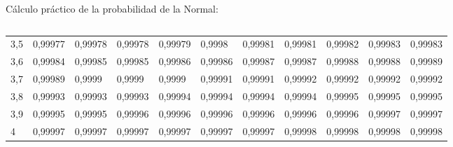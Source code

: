 \documentclass[11pt,handout]{beamer}
\begin{document}
\begin{frame}{Cálculo práctico de la probabilidad de la Normal:}
\begin{columns}
\begin{column}{0.6\textwidth}
{\begin{tabular}{l|llllllllll}
3,5 & 0,99977 & 0,99978 & 0,99978 & 0,99979 & 0,9998  & 0,99981 & 0,99981 & 0,99982 & 0,99983 & 0,99983 \\
3,6 & 0,99984 & 0,99985 & 0,99985 & 0,99986 & 0,99986 & 0,99987 & 0,99987 & 0,99988 & 0,99988 & 0,99989 \\
3,7 & 0,99989 & 0,9999  & 0,9999  & 0,9999  & 0,99991 & 0,99991 & 0,99992 & 0,99992 & 0,99992 & 0,99992 \\
3,8 & 0,99993 & 0,99993 & 0,99993 & 0,99994 & 0,99994 & 0,99994 & 0,99994 & 0,99995 & 0,99995 & 0,99995 \\
3,9 & 0,99995 & 0,99995 & 0,99996 & 0,99996 & 0,99996 & 0,99996 & 0,99996 & 0,99996 & 0,99997 & 0,99997 \\
4   & 0,99997 & 0,99997 & 0,99997 & 0,99997 & 0,99997 & 0,99997 & 0,99998 & 0,99998 & 0,99998 & 0,99998
\end{tabular}

}
\end{column}
\end{columns}


\end{frame}
\end{document}
